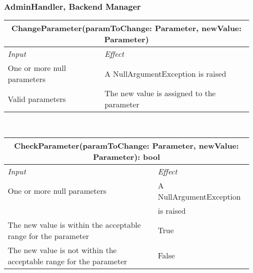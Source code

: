 		\subsubsection*{AdminHandler, Backend Manager}
			\begin{tabular}{ |l|l| }
				\hline
				\multicolumn{2}{|c|}{ChangeParameter(paramToChange: Parameter, newValue: Parameter)}\\
				\hline
				\textit{Input} & \textit{Effect}\\ \hline
				One or more null parameters & A NullArgumentException is raised\\ \hline
				Valid parameters & The new value is assigned to the parameter\\ \hline
			\end{tabular}
			\\
			\begin{tabular}{ |l|l| }
				\hline
				\multicolumn{2}{|c|}{CheckParameter(paramToChange: Parameter, newValue: Parameter): bool}\\
				\hline
				\textit{Input} & \textit{Effect}\\ \hline
				One or more null parameters & A NullArgumentException\\& is raised\\ \hline
				The new value is within the acceptable range for the parameter & True\\ \hline
				The new value is not within the acceptable range for the parameter & False\\ \hline
			\end{tabular}
			\\
		
		
		
		
		
